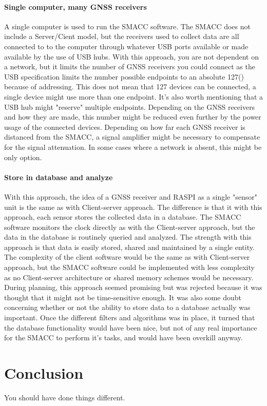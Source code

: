 \documentclass[12pt,english,a4paper]{report}
\begin{document}
\subsubsection{Single computer, many GNSS receivers}\label{scmgr}
A single computer is used to run the SMACC software. The SMACC does not include a Server/Cient model, but the receivers used to collect data are all connected to to the computer through whatever USB ports available or made available by the use of USB hubs. With this approach, you are not dependent on a network, but it limits the number of GNSS receivers you could connect as the USB specification limits the number possible endpoints to an absolute 127(\cite[pp. 3]{USBTC}) because of addressing. This does not mean that 127 devices can be connected, a single device might use more than one endpoint. It's also worth mentioning that a USB hub might "reserve" multiple endpoints. Depending on the GNSS receivers and how they are made, this number might be reduced even further by the power usage of the connected devices. Depending on how far each GNSS receiver is distanced from the SMACC, a signal amplifier might be necessary to compensate for the signal attenuation. In some cases where a network is absent, this might be only option.

\subsubsection{Store in database and analyze}
With this approach, the idea of a GNSS receiver and RASPI as a single "sensor" unit is the same as with Client-server approach. The difference is that it with this approach, each sensor stores the collected data in a database. The SMACC software monitors the clock directly as with the Client-server approach, but the data in the database is routinely queried and analyzed. The strength with this approach is that data is easily stored, shared and maintained by a single entity. The complexity of the client software would be the same as with Client-server approach, but the SMACC software could be implemented with less complexity as no Client-server architecture or shared memory schemes would be necessary. During planning, this approach seemed promising but was rejected because it was thought that it might not be time-sensitive enough. It was also some doubt concerning whether or not the ability to store data to a database actually was important. Once the different filters and algorithms was in place, it turned that the database functionality would have been nice, but not of any real importance for the SMACC to perform it's tasks, and would have been overkill anyway.

\chapter{Conclusion}
You should have done things different.




\newpage
\printbibliography[title={Complete Bibliography},heading=bibintoc]
\end{document}
